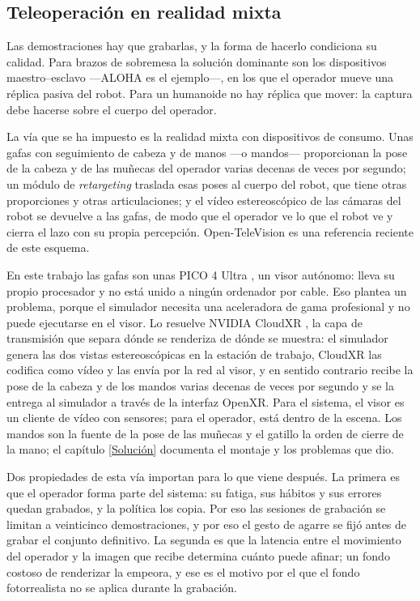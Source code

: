 \subsection{Teleoperación en realidad mixta}

Las demostraciones hay que grabarlas, y la forma de hacerlo condiciona su calidad. Para brazos de
sobremesa la solución dominante son los dispositivos maestro--esclavo —ALOHA es el ejemplo—, en los
que el operador mueve una réplica pasiva del robot. Para un humanoide no hay réplica que mover: la
captura debe hacerse sobre el cuerpo del operador.

La vía que se ha impuesto es la realidad mixta con dispositivos de consumo. Unas gafas con
seguimiento de cabeza y de manos —o mandos— proporcionan la pose de la cabeza y de las muñecas del
operador varias decenas de veces por segundo; un módulo de \textit{retargeting} traslada esas poses
al cuerpo del robot, que tiene otras proporciones y otras articulaciones; y el vídeo estereoscópico
de las cámaras del robot se devuelve a las gafas, de modo que el operador ve lo que el robot ve y
cierra el lazo con su propia percepción. Open-TeleVision \cite{cheng2024television} es una
referencia reciente de este esquema.

En este trabajo las gafas son unas PICO 4 Ultra \cite{pico4ultra}, un visor autónomo: lleva su
propio procesador y no está unido a ningún ordenador por cable. Eso plantea un problema, porque el
simulador necesita una aceleradora de gama profesional y no puede ejecutarse en el visor. Lo
resuelve NVIDIA CloudXR \cite{nvidia_cloudxr}, la capa de transmisión que separa dónde se renderiza
de dónde se muestra: el simulador genera las dos vistas estereoscópicas en la estación de trabajo,
CloudXR las codifica como vídeo y las envía por la red al visor, y en sentido contrario recibe la
pose de la cabeza y de los mandos varias decenas de veces por segundo y se la entrega al simulador
a través de la interfaz OpenXR. Para el sistema, el visor es un cliente de vídeo con sensores; para
el operador, está dentro de la escena. Los mandos son la fuente de la pose de las muñecas y el
gatillo la orden de cierre de la mano; el capítulo \ref{Solución} documenta el montaje y los
problemas que dio.

Dos propiedades de esta vía importan para lo que viene después. La primera es que el operador forma
parte del sistema: su fatiga, sus hábitos y sus errores quedan grabados, y la política los copia. Por
eso las sesiones de grabación se limitan a veinticinco demostraciones, y por eso el gesto de agarre
se fijó antes de grabar el conjunto definitivo. La segunda es que la latencia entre el movimiento
del operador y la imagen que recibe determina cuánto puede afinar; un fondo costoso de renderizar
la empeora, y ese es el motivo por el que el fondo fotorrealista no se aplica durante la grabación.

